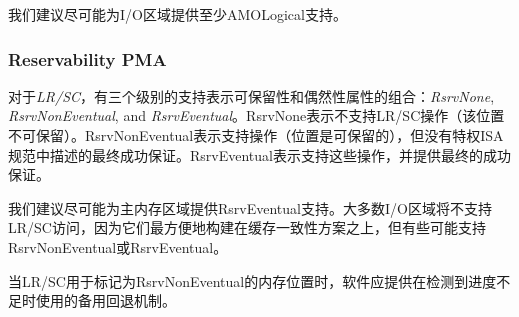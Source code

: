 {\iffalse
\begin{commentary}
We recommend providing at least AMOLogical support for I/O regions
where possible.
\end{commentary}
\fi
\begin{commentary}
我们建议尽可能为I/O区域提供至少AMOLogical支持。
\end{commentary}

\subsubsection{Reservability PMA}

\iffalse
For {\em LR/SC}, there are three levels of support indicating combinations of
the reservability and eventuality properties:  {\em RsrvNone},
{\em RsrvNonEventual}, and {\em RsrvEventual}.
RsrvNone indicates that no LR/SC operations are supported (the location is
non-reservable).  RsrvNonEventual indicates that the operations are supported
(the location is reservable), but without the eventual success guarantee
described in the unprivileged ISA specification.  RsrvEventual indicates that
the operations are supported and provide the eventual success guarantee.
\fi
对于{\em LR/SC}，有三个级别的支持表示可保留性和偶然性属性的组合：{\em RsrvNone},
{\em RsrvNonEventual}, and {\em RsrvEventual}。RsrvNone表示不支持LR/SC操作（该位置不可保留）。RsrvNonEventual表示支持操作（位置是可保留的），但没有特权ISA规范中描述的最终成功保证。RsrvEventual表示支持这些操作，并提供最终的成功保证。

\iffalse
\begin{commentary}
We recommend providing RsrvEventual support for main memory regions
where possible.  Most I/O regions will not support LR/SC accesses, as
these are most conveniently built on top of a cache-coherence scheme, but some
may support RsrvNonEventual or RsrvEventual.
\end{commentary}
\fi
\begin{commentary}
我们建议尽可能为主内存区域提供RsrvEventual支持。大多数I/O区域将不支持LR/SC访问，因为它们最方便地构建在缓存一致性方案之上，但有些可能支持RsrvNonEventual或RsrvEventual。
\end{commentary}

\iffalse
\begin{commentary}
When LR/SC is used for memory locations marked RsrvNonEventual, software should
provide alternative fall-back mechanisms used when lack of progress is
detected.
\end{commentary}
\fi
\begin{commentary}
当LR/SC用于标记为RsrvNonEventual的内存位置时，软件应提供在检测到进度不足时使用的备用回退机制。
\end{commentary}

}
